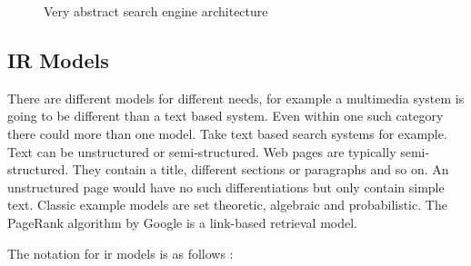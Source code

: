 \begin{figure}[htb]
  \centering
\caption[Search Engine Architecture]{Very abstract search engine architecture}
\label{fig:SEA}
\end{figure}

\subsection{IR Models}

\begin{comment}
  \gls{ir} models describe ranking algorithms formally. ???
\end{comment}

There are different models for different needs, for example a multimedia system is going to be different than a text based system. Even within one such category there could more than one model. Take text based search systems for example. Text can be unstructured or semi-structured. Web pages are typically semi-structured. They contain a title, different sections or paragraphs and so on. An unstructured page would have no such differentiations but only contain simple text.  Classic example models are set theoretic, algebraic and probabilistic. The PageRank algorithm by Google is a link-based retrieval model.

The notation for \gls{ir} models is as follows \citep[quoted from][p.58]{Baeza-Yates2011}:

